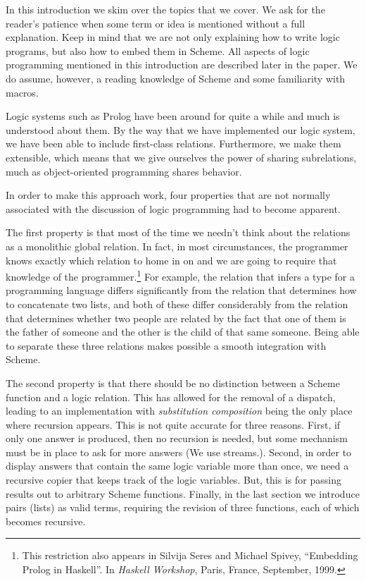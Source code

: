 In this introduction we skim over the topics that we cover.  We ask
for the reader's patience when some term or idea is mentioned without
a full explanation.  Keep in mind that we are not only explaining how
to write logic programs, but also how to embed them in Scheme.  All
aspects of logic programming mentioned in this introduction are
described later in the paper.  We do assume, however, a reading
knowledge of Scheme and some familiarity with macros.

Logic systems such as Prolog have been around for quite a while and much is
understood about them.  By the way that we have implemented our logic
system, we have been able to include first-class relations.  Furthermore,
we make them extensible, which means that we give ourselves the power
of sharing subrelations, much as object-oriented programming shares
behavior.  

In order to make this approach work, four properties that are not
normally associated with the discussion of logic programming had to
become apparent.  

The first property is that most of the time we needn't think about
the relations as a monolithic global relation.  In fact, in
most circumstances, the programmer knows exactly which relation to
home in on and we are going to require that knowledge of the
programmer.\footnote{This restriction also appears in Silvija Seres
and Michael Spivey, ``Embedding Prolog in Haskell''. In \emph{Haskell
Workshop}, Paris, France, September, 1999.}  For example, the relation
that infers a type for a programming language differs significantly
from the relation that determines how to concatenate two
lists, and both of these differ considerably from the relation
that determines whether two people are related by the fact that one of
them is the father of someone and the other is the child of that same
someone.  Being able to separate these three relations makes possible
a smooth integration with Scheme.

The second property is that there should be no distinction between a
Scheme function and a logic relation.  This has allowed for the
removal of a dispatch, leading to an implementation with \emph{substitution
composition} being the only place where recursion appears.  This is not
quite accurate for three reasons.  First, if only one answer is
produced, then no recursion is needed, but some mechanism must be in
place to ask for more answers (We use streams.).  Second, in order to
display answers that contain the same logic variable more than once,
we need a recursive copier that keeps track of the logic variables.
But, this is for passing results out to arbitrary Scheme functions.
Finally, in the last section we introduce pairs (lists) as valid
terms, requiring the revision of three functions, each of which
becomes recursive.

